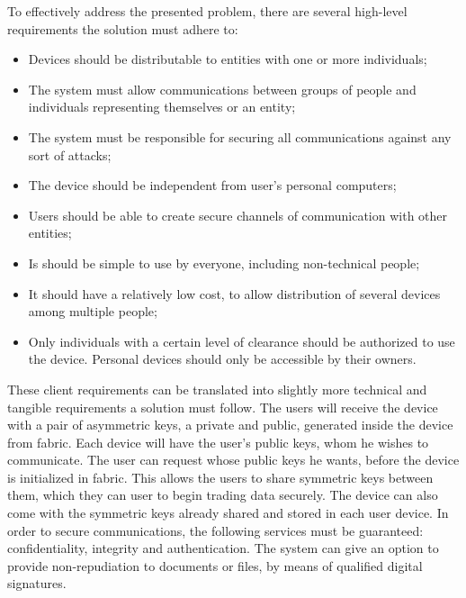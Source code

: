 To effectively address the presented problem, there are several high-level requirements the solution must adhere to:
\begin{itemize}
	\item Devices should be distributable to entities with one or more individuals;
	\item The system must allow communications between groups of people and individuals representing themselves or an entity;
	\item The system must be responsible for securing all communications against any sort of attacks;
	\item The device should be independent from user's personal computers;
	\item Users should be able to create secure channels of communication with other entities;
	\item Is should be simple to use by everyone, including non-technical people;
	\item It should have a relatively low cost, to allow distribution of several devices among multiple people;
	\item Only individuals with a certain level of clearance should be authorized to use the device. Personal devices should only be accessible by their owners.
\end{itemize}

These client requirements can be translated into slightly more technical and tangible requirements a solution must follow.
The users will receive the device with a pair of asymmetric keys, a private and public, generated inside the device from fabric.
Each device will have the user's public keys, whom he wishes to communicate.
The user can request whose public keys he wants, before the device is initialized in fabric.
This allows the users to share symmetric keys between them, which they can user to begin trading data securely.
The device can also come with the symmetric keys already shared and stored in each user device.
In order to secure communications, the following services must be guaranteed: confidentiality, integrity and authentication.
The system can give an option to provide non-repudiation to documents or files, by means of qualified digital signatures.

